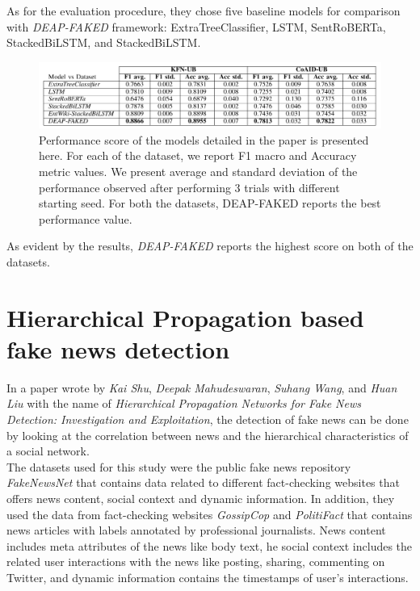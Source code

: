 \documentclass[10pt, english]{report}
\begin{document}
As for the evaluation procedure, they chose five baseline models for comparison with \textit{DEAP-FAKED} framework: ExtraTreeClassifier, LSTM, SentRoBERTa, StackedBiLSTM, and StackedBiLSTM.

\begin{figure}[H]
	\centering
	\includegraphics[scale=0.4]{img/deap_faked_evaluation.png}
	\caption{Performance score of the models detailed in the paper is presented here. For each of the dataset, we report F1 macro and Accuracy metric values. We present average and standard deviation of the performance observed after performing 3 trials with different starting seed. For both the datasets, DEAP-FAKED reports the best performance value. \cite{mayank2021deap}}
\end{figure}

As evident by the results, \textit{DEAP-FAKED} reports the highest score on both of the datasets.


\section{Hierarchical Propagation based fake news detection \cite{shu2020hierarchical} \cite{castillo2011information}}
In a paper wrote by \textit{Kai Shu}, \textit{Deepak Mahudeswaran}, \textit{Suhang Wang}, and \textit{Huan Liu} with the name of \textit{Hierarchical Propagation Networks for Fake News Detection: Investigation and Exploitation}, the detection of fake news can be done by looking at the correlation between news and the hierarchical characteristics of a social network.\\

The datasets used for this study were the public fake news repository \textit{FakeNewsNet} \cite{shu2018fakenewsnet} that contains data related to different fact-checking websites that offers news content, social context and dynamic information. In addition, they used the data from fact-checking websites \textit{GossipCop} and \textit{PolitiFact} that contains news articles with labels annotated by professional journalists. News content includes meta attributes of the news like body text, he social context includes the related user interactions with the news like posting, sharing, commenting on Twitter, and dynamic information contains the timestamps of user's interactions.\\
\end{document}
